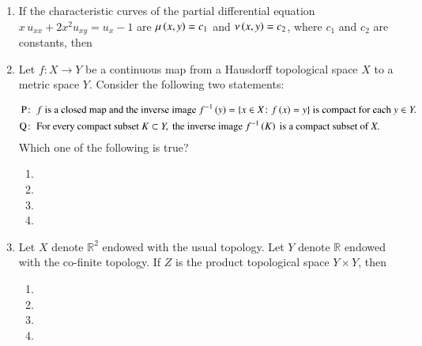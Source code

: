 \documentclass[journal,12pt,onecolumn]{IEEEtran}
\theoremstyle{remark}
\begin{document}
\begin{enumerate}[start=10]
\item If the characteristic curves of the partial differential equation $x\,u_{xx} + 2x^{2}u_{xy} = u_{x} - 1$ are
$\mu\left(x, y\right) = c_1$ and $\nu\left(x, y\right) = c_2$, where $c_1$ and $c_2$ are constants, then 

\hfill{}
\begin{enumerate}
\end{enumerate}

\item Let $f \colon X \to Y$ be a continuous map from a Hausdorff topological space $X$ to a metric space
$Y$. Consider the following two statements:

\hfill{}
\begin{align*}
\text{P}\colon &\ f \text{ is a closed map and the inverse image } f^{-1}\left(y\right) = \{x \in X \colon f\left(x\right) = y\} \text{ is compact for each } y \in Y.\\
\text{Q}\colon &\ \text{For every compact subset } K \subset Y, \text{ the inverse image } f^{-1}\left(K\right) \text{ is a compact subset of } X.
\end{align*}
Which one of the following is true?
\begin{enumerate}

\item {}
\item {}
\item {}
\item {}

\end{enumerate}

\item Let $X$ denote $\mathbb{R}^2$ endowed with the usual topology. Let $Y$ denote $\mathbb{R}$ endowed with the co-finite
topology. If $Z$ is the product topological space $Y \times Y$, then 

\hfill{}
\begin{enumerate}
\item {}
\item {}
\item {}
\item {}
\end{enumerate}


\end{enumerate}
\end{document}
